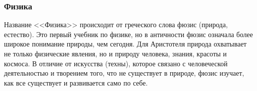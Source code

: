 \subsubsection{Физика}


Название <<Физика>> происходит от греческого слова фюзис (природа, естество). Это первый учебник по физике, но в античности фюзис означала более широкое понимание природы, чем сегодня. Для Аристотеля природа охватывает не только физические явления, но и природу человека, знания, красоты и космоса. В отличие от искусства (техны), которое связано с человеческой деятельностью и творением того, что не существует в природе, фюзис изучает, как все существует и развивается само по себе.


